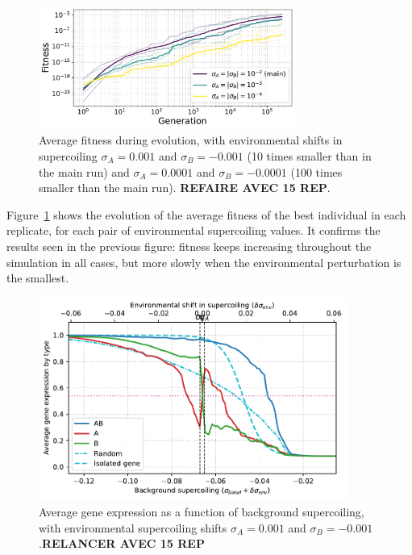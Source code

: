 \begin{figure}
\centering
\includegraphics[width=0.75\textwidth]{param/sigma/fitness_all_with_main.pdf}
\caption[Average fitness during evolution, with decreasing environmental supercoiling shifts]{Average fitness during evolution, with environmental shifts in supercoiling $\sigma_A = 0.001$ and $\sigma_B = -0.001$ (10 times smaller than in the main run) and $\sigma_A = 0.0001$ and $\sigma_B = -0.0001$ (100 times smaller than the main run). \textbf{REFAIRE AVEC 15 REP}.}
\label{fig:param:sigma-fitness}
\end{figure}

Figure~\ref{fig:param:sigma-fitness} shows the evolution of the average fitness of the best individual in each replicate, for each pair of environmental supercoiling values.
It confirms the results seen in the previous figure: fitness keeps increasing throughout the simulation in all cases, but more slowly when the environmental perturbation is the smallest.

\begin{figure}
\centering
\includegraphics[width=0.9\textwidth]{param/sigma/sigma-1e-3/activity_sigmas_avg.pdf}
\caption[Average gene expression as a function of background supercoiling, with an absolute environmental supercoiling shift of 0.001]{Average gene expression as a function of background supercoiling, with environmental supercoiling shifts $\sigma_A = 0.001$ and $\sigma_B = -0.001$.\textbf{RELANCER AVEC 15 REP}}
\label{fig:param:sigma-1e-3-activ-by-sigma}
\end{figure}

